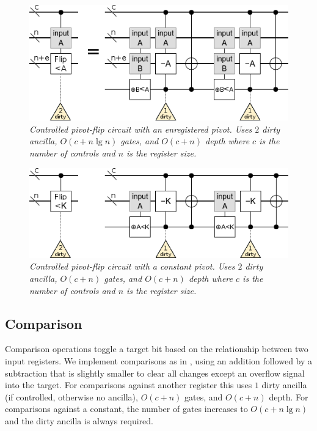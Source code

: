 \documentclass[twocolumn]{article}
\begin{document}
\begin{figure}
  \centering
  \includegraphics[width=\linewidth]{assets/controlled-pivot-flip.png}
  \caption{\em
    Controlled pivot-flip circuit with an enregistered pivot.
    Uses $2$ dirty ancilla, $O(c + n \lg n)$ gates, and $O(c + n)$ depth where $c$ is the number of controls and $n$ is the register size.
  }
  \label{fig:controlled-pivot-flip}
\end{figure}

\begin{figure}
  \centering
  \includegraphics[width=\linewidth]{assets/controlled-const-pivot-flip.png}
  \caption{\em
    Controlled pivot-flip circuit with a constant pivot.
    Uses $2$ dirty ancilla, $O(c + n)$ gates, and $O(c + n)$ depth where $c$ is the number of controls and $n$ is the register size.
  }
  \label{fig:controlled-const-pivot-flip}
\end{figure}


\subsection{Comparison}

Comparison operations toggle a target bit based on the relationship between two input registers.
We implement comparisons as in \cite{takahashi2005}, using an addition followed by a subtraction that is slightly smaller to clear all changes except an overflow signal into the target.
For comparisons against another register this uses $1$ dirty ancilla (if controlled, otherwise no ancilla), $O(c + n)$ gates, and $O(c + n)$ depth.
For comparisons against a constant, the number of gates increases to $O(c + n \lg n)$ and the dirty ancilla is always required.
\end{document}
